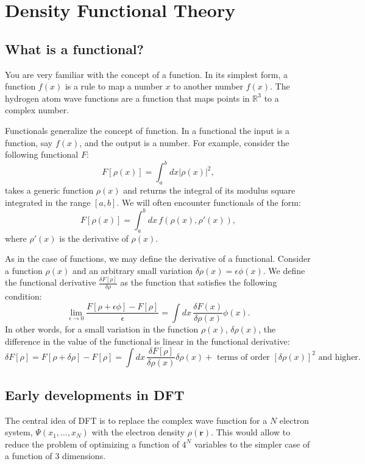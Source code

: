 \documentclass[../Main/chem532-notes.tex]{subfiles}
\begin{document}
\setcounter{chapter}{6}

\chapter{Density Functional Theory}

\section{What is a functional?}
You are very familiar with the concept of a function. In its simplest form, a function $f(x)$ is a rule to map a number $x$ to another number $f(x)$.
The hydrogen atom wave functions are a function that maps points in $\mathbb{R}^3$ to a complex number.

Functionals generalize the concept of function. In a functional the input is a function, say $f(x)$, and the output is a number.
For example, consider the following functional $F$:
\begin{equation}
F[\rho(x)] = \int_a^b dx |\rho(x)|^2,
\end{equation}
takes a generic function $\rho(x)$ and returns the integral of its modulus square integrated in the range $[a,b]$.
We will often encounter functionals of the form:
\begin{equation}
F[\rho(x)] = \int_a^b dx\,f(\rho(x),\rho'(x)),
\end{equation}
where $\rho'(x)$ is the derivative of $\rho(x)$.

As in the case of functions, we may define the derivative of a functional.
Consider a function $\rho(x)$ and an arbitrary small variation $\delta\rho(x) = \epsilon \phi(x)$.
We define the functional derivative $\frac{\delta F[\rho]}{\delta \rho}$ as the function that satisfies the following condition:
\begin{equation}
\lim_{\epsilon \rightarrow 0} \frac{F[\rho + \epsilon \phi] - F[\rho]}{\epsilon}
= \int dx \,\frac{\delta F(x)}{\delta \rho(x)} \phi(x).
\end{equation}
In other words, for a small variation in the function $\rho(x)$, $\delta \rho(x)$, the difference in the value of the functional is linear in the functional derivative:
\begin{equation}
\delta F[\rho] = F[\rho + \delta\rho] - F[\rho] = \int dx \,\frac{\delta F[\rho]}{\delta \rho(x)} \delta\rho(x) + \text{ terms of order } [\delta\rho(x)]^2 \text{ and higher}.
\end{equation}

\section{Early developments in DFT}
The central idea of DFT is to replace the complex wave function for a $N$ electron system, $\Psi(x_1,\ldots,x_N)$ with the electron density $\rho(\mathbf{r})$.
This would allow to reduce the problem of optimizing a function of $4^N$ variables to the simpler case of a function of 3 dimensions.
\end{document}
